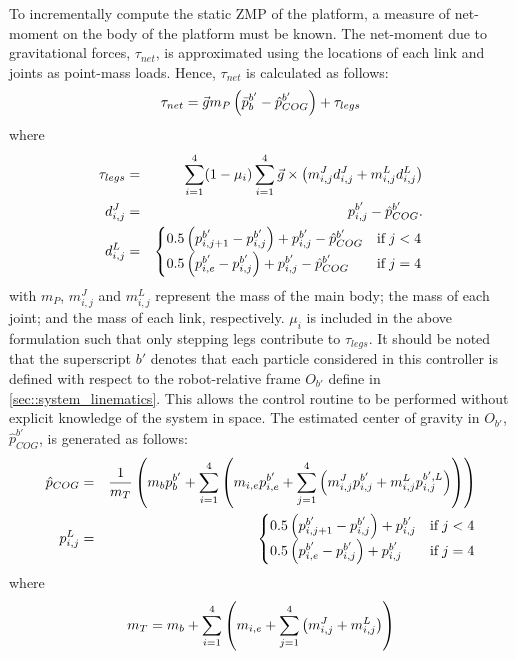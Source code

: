 		To incrementally compute the static ZMP of the platform, a measure of net-moment on the body of the platform must be known. The net-moment due to gravitational forces, $\tau_{net}$, is approximated using the locations of each link and joints as point-mass loads. Hence, $\tau_{net}$ is calculated as follows:
			\begin{equation}
				\tau_{net} 	= \vec{g} m_{P}  \left(\bar{p}_{b}^{b'}-\hat{p}_{COG}^{b'} \right)	+ \tau_{legs}
				\label{eq::NetMoment}
			\end{equation}
		where
			\begin{eqnarray*}
					\tau_{legs}		& = & \sum_{i=1}^{4} (1-\mu_{i})  \sum_{i=1}^{4} \vec{g} \times  \left( m_{i,j}^{J} d_{i,j}^{J} + m_{i,j}^{L} d_{i,j}^{L} \right)	\nonumber \\
					d_{i,j}^{J} 	& = & {{p}_{i,j}^{b'}-\hat{p}_{COG}^{b'}.} \nonumber \\														
					d_{i,j}^{L} 	& = &
					\begin{cases}
					{ 0.5  \left({p}_{i,j+1}^{b'}-{p}_{i,j}^{b'}\right) + {p}_{i,j}^{b'} - \hat{p}_{COG}^{b'}} 	& \text{if}\hspace{1mm} j < 4 \\
					{ 0.5  \left({p}_{i,e}^{b'}-{p}_{i,j}^{b'}\right) + {p}_{i,j}^{b'} - \hat{p}_{COG}^{b'}} 		& \text{if}\hspace{1mm} j = 4
					\end{cases} \nonumber
				\label{eq::Levers}
			\end{eqnarray*}
		with $m_{P}$, $m_{i,j}^{J}$ and $m_{i,j}^{L}$ represent the mass of the main body; the mass of each joint; and the mass of each link, respectively. $\mu_{i}$ is included in the above formulation such that only stepping legs contribute to  $\tau_{legs}$. It should be noted that the superscript ${b'}$ denotes that each particle considered in this controller is defined with respect to the robot-relative frame $O_{b'}$ define in \ref{sec::system_linematics}. This allows the control routine to be performed without explicit knowledge of the system in space. The estimated center of gravity in $O_{b'}$, $\hat{p}_{COG}^{b'}$, is generated as follows:
			\begin{eqnarray*}
				\hat{p}_{COG} 	& = & \frac{1}{m_{T}}\left( m_{b}p_{b}^{b'} + \sum_{i=1}^{4} \left(m_{i,e}{p}_{i,e}^{b'} + \sum_{j=1}^{4} \left(  m_{i,j}^{J}{p}_{i,j}^{b'} +  m_{i,j}^{L}{p}_{i,j}^{b',L} \right) \right)\right) 	\nonumber \\
				{p}_{i,j}^{L} 	& = & 
					\begin{cases}
					{ 0.5  \left({p}_{i,j+1}^{b'}-{p}_{i,j}^{b'}\right) + {p}_{i,j}^{b'} } 	& \text{if}\hspace{1mm} j < 4 \\
					{ 0.5  \left({p}_{i,e}^{b'}-{p}_{i,j}^{b'}\right) + {p}_{i,j}^{b'} } 		& \text{if}\hspace{1mm} j = 4
					\end{cases} \nonumber
				\label{eq::cog_estimate}
			\end{eqnarray*}
		where
			\begin{equation}
				m_{T} = m_{b} + \sum_{i=1}^{4} \left(m_{i,e} + \sum_{j=1}^{4} \left(  m_{i,j}^{J} +  m_{i,j}^{L} \right) \right)
			\end{equation}


